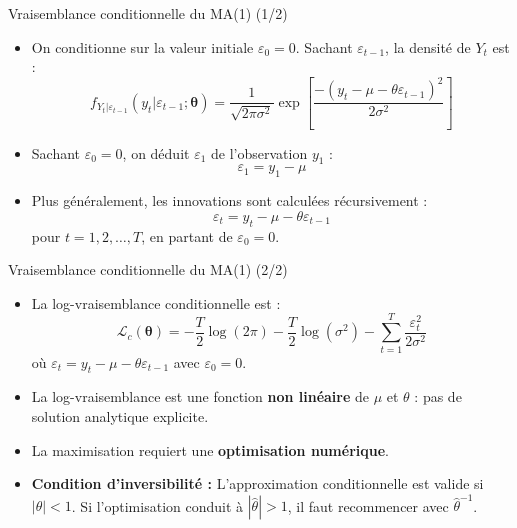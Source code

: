 \documentclass[11pt,aspectratio=169]{beamer}
\begin{document}
\begin{frame}{Vraisemblance conditionnelle du MA(1) (1/2)}

\begin{itemize}

\item On conditionne sur la valeur initiale $\varepsilon_0 = 0$. Sachant $\varepsilon_{t-1}$, la densité de $Y_t$ est :
  \[
  f_{Y_t | \varepsilon_{t-1}}(y_t | \varepsilon_{t-1}; \bm{\theta}) = \frac{1}{\sqrt{2\pi\sigma^2}} \exp\left[\frac{-(y_t - \mu - \theta \varepsilon_{t-1})^2}{2\sigma^2}\right]
  \]\newline

\item Sachant $\varepsilon_0 = 0$, on déduit $\varepsilon_1$ de l'observation $y_1$ :
  \[
  \varepsilon_1 = y_1 - \mu
  \]\newline

\item Plus généralement, les innovations sont calculées récursivement :
  \[
  \varepsilon_t = y_t - \mu - \theta \varepsilon_{t-1}
  \]
  pour $t = 1, 2, \ldots, T$, en partant de $\varepsilon_0 = 0$.

\end{itemize}

\end{frame}

\begin{frame}{Vraisemblance conditionnelle du MA(1) (2/2)}

\begin{itemize}

\item La log-vraisemblance conditionnelle est :
  \[
  \mathcal{L}_c(\bm{\theta}) = -\frac{T}{2}\log(2\pi) - \frac{T}{2}\log(\sigma^2) - \sum_{t=1}^{T} \frac{\varepsilon_t^2}{2\sigma^2}
  \]
  où $\varepsilon_t = y_t - \mu - \theta \varepsilon_{t-1}$ avec $\varepsilon_0 = 0$.\newline

\item La log-vraisemblance est une fonction \textbf{non linéaire} de $\mu$ et $\theta$ : pas de solution analytique explicite.\newline

\item La maximisation requiert une \textbf{optimisation numérique}.\newline

\item \textbf{Condition d'inversibilité :} L'approximation conditionnelle est valide si $|\theta| < 1$. Si l'optimisation conduit à $|\hat{\theta}| > 1$, il faut recommencer avec $\hat{\theta}^{-1}$.

\end{itemize}

\end{frame}
\end{document}
